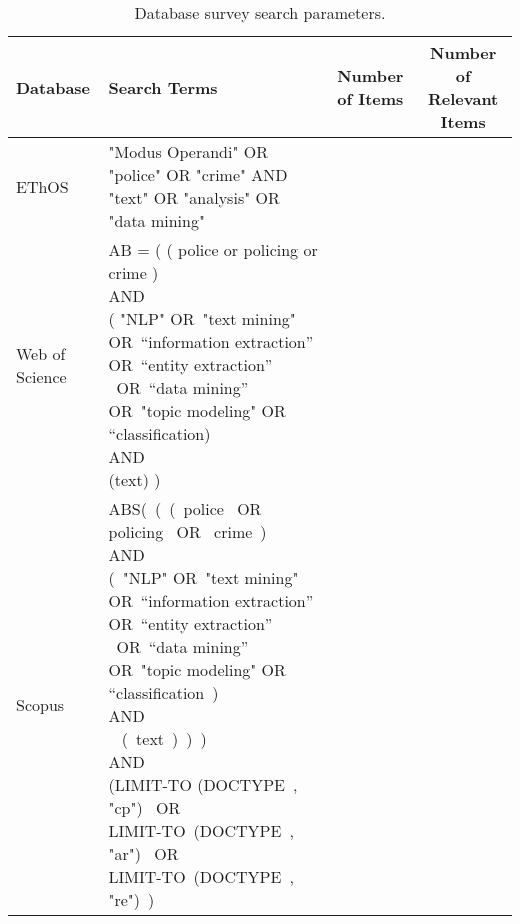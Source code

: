 \begin{table}[]
\centering
\begin{tabular}{@{}llcc@{}}   %
\toprule
Database &
  Search Terms &
  \parbox{0.1\linewidth}{\centering Number of Items} &
   \parbox{0.15\linewidth}{\centering Number of Relevant Items} \\ \midrule
EThOS &
   \parbox{0.5\linewidth}{"Modus Operandi" OR "police" OR "crime" AND "text" OR "analysis" OR "data mining"} &
  \parbox{0.1\linewidth}{}&
  \parbox{0.1\linewidth}{} \\ \midrule
Web of Science & 
 \parbox{0.5\linewidth}{\raggedright AB = ( ( police or policing or crime ) \\ AND \\( "NLP" OR "text mining" OR “information extraction” OR “entity extraction”  OR “data mining” OR "topic modeling" OR “classification)\\ AND \\(text) ) } &
 \parbox{0.1\linewidth}{}&
  \parbox{0.1\linewidth}{} \\ \midrule
Scopus         &
  \parbox{0.5\linewidth}{\raggedright ABS( ( ( police  OR  policing  OR  crime )  \\AND \\ ( "NLP" OR "text mining" OR “information extraction” OR “entity extraction”  OR “data mining” OR "topic modeling" OR “classification )  \\AND\\  ( text ) ) ) \\ AND \\(LIMIT-TO (DOCTYPE ,  "cp")  OR\\LIMIT-TO (DOCTYPE ,  "ar")  OR\\LIMIT-TO (DOCTYPE ,  "re") ) }                                         &
 \parbox{0.1\linewidth}{} &
  \parbox{0.1\linewidth}{}  \\ \bottomrule
\end{tabular}
\caption{\label{tab:search} Database survey search parameters.}
\end{table}






